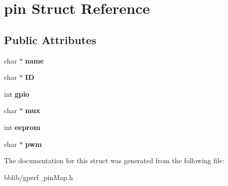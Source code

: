 \hypertarget{structpin}{\section{pin \-Struct \-Reference}
\label{structpin}
}
\subsection*{\-Public \-Attributes}
\begin{DoxyCompactItemize}
\item 
\hypertarget{structpin_a83d27e14d4dd6e48b483bb4a744eea00}{char $\ast$ {\bfseries name}}\label{structpin_a83d27e14d4dd6e48b483bb4a744eea00}

\item 
\hypertarget{structpin_a4e8c073b461efe8da540b7533c55c0e8}{char $\ast$ {\bfseries \-I\-D}}\label{structpin_a4e8c073b461efe8da540b7533c55c0e8}

\item 
\hypertarget{structpin_a14af7a14f1a06f996a17135836e4878e}{int {\bfseries gpio}}\label{structpin_a14af7a14f1a06f996a17135836e4878e}

\item 
\hypertarget{structpin_a057dfaec5e5c1fff4bdf8749502216f4}{char $\ast$ {\bfseries mux}}\label{structpin_a057dfaec5e5c1fff4bdf8749502216f4}

\item 
\hypertarget{structpin_a318ca14778fc318762a6cced7b6ee858}{int {\bfseries eeprom}}\label{structpin_a318ca14778fc318762a6cced7b6ee858}

\item 
\hypertarget{structpin_af76b233ff684e7b29459fdb397e53f0b}{char $\ast$ {\bfseries pwm}}\label{structpin_af76b233ff684e7b29459fdb397e53f0b}

\end{DoxyCompactItemize}


\-The documentation for this struct was generated from the following file\-:\begin{DoxyCompactItemize}
\item 
bblib/gperf\-\_\-pin\-Map.\-h\end{DoxyCompactItemize}
